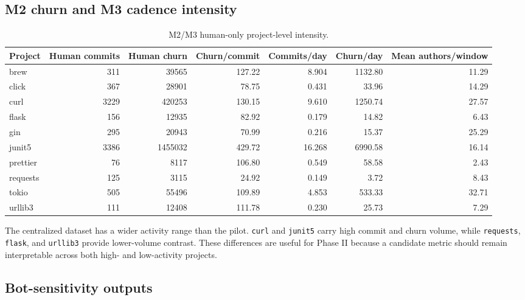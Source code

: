 \subsection{M2 churn and M3 cadence intensity}
\label{sec:results_m2_m3}

\begin{table}[H]
\centering
\scriptsize
\renewcommand{\arraystretch}{1.12}
\begin{tabular}{lrrrrrr}
\toprule
\textbf{Project} & \textbf{Human commits} & \textbf{Human churn} & \textbf{Churn/commit} & \textbf{Commits/day} & \textbf{Churn/day} & \textbf{Mean authors/window} \\
\midrule
brew     & 311  & 39565   & 127.22 & 8.904  & 1132.80 & 11.29 \\
click    & 367  & 28901   & 78.75  & 0.431  & 33.96   & 14.29 \\
curl     & 3229 & 420253  & 130.15 & 9.610  & 1250.74 & 27.57 \\
flask    & 156  & 12935   & 82.92  & 0.179  & 14.82   & 6.43  \\
gin      & 295  & 20943   & 70.99  & 0.216  & 15.37   & 25.29 \\
junit5   & 3386 & 1455032 & 429.72 & 16.268 & 6990.58 & 16.14 \\
prettier & 76   & 8117    & 106.80 & 0.549  & 58.58   & 2.43  \\
requests & 125  & 3115    & 24.92  & 0.149  & 3.72    & 8.43  \\
tokio    & 505  & 55496   & 109.89 & 4.853  & 533.33  & 32.71 \\
urllib3  & 111  & 12408   & 111.78 & 0.230  & 25.73   & 7.29  \\
\bottomrule
\end{tabular}
\caption[M2/M3 human-only intensity.]{M2/M3 human-only project-level intensity.}
\label{tab:m2_m3_intensity}
\end{table}

The centralized dataset has a wider activity range than the pilot. \texttt{curl} and \texttt{junit5}
carry high commit and churn volume, while \texttt{requests}, \texttt{flask}, and \texttt{urllib3}
provide lower-volume contrast. These differences are useful for Phase II because a candidate metric
should remain interpretable across both high- and low-activity projects.

\subsection{Bot-sensitivity outputs}
\label{sec:bot_sensitivity_outputs}

